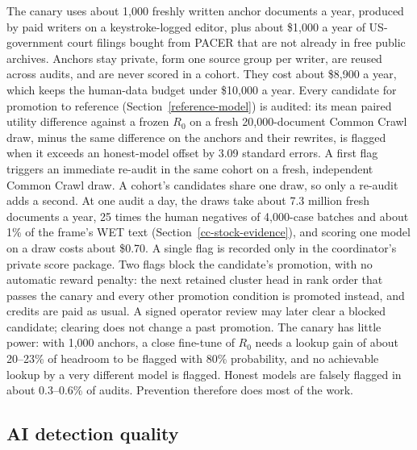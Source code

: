 The canary uses about 1,000 freshly written anchor documents a year, produced by
paid writers on a keystroke-logged editor, plus about \$1,000 a year of
US-government court filings bought from PACER that are not already in free
public archives. Anchors stay private, form one source group per writer, are
reused across audits, and are never scored in a cohort. They cost about \$8,900
a year, which keeps the human-data budget under \$10,000 a year. Every
candidate for promotion to reference (Section~\ref{reference-model}) is
audited: its mean paired utility difference against a frozen \(R_0\) on a fresh
20,000-document Common Crawl draw, minus the same difference on the anchors and
their rewrites, is flagged when it exceeds an honest-model offset by 3.09
standard errors. A first flag triggers an immediate re-audit in the same cohort
on a fresh, independent Common Crawl draw. A cohort's candidates share one
draw, so only a re-audit adds a second. At one audit a day, the draws take
about 7.3 million fresh documents a year, 25 times the human negatives of
4,000-case batches and about 1\% of the frame's WET text
(Section~\ref{cc-stock-evidence}), and scoring one model on a draw costs about
\$0.70. A single flag is recorded only in the coordinator's private score
package. Two flags block the candidate's promotion, with no automatic
reward penalty: the next retained cluster head in rank order that passes the
canary and every other promotion condition is promoted instead, and credits are paid as
usual. A signed operator review may later clear a blocked candidate; clearing
does not change a past promotion. The canary has little power: with 1,000 anchors, a
close fine-tune of \(R_0\) needs a lookup gain of about 20--23\% of headroom to
be flagged with 80\% probability, and no achievable lookup by a very different
model is flagged. Honest models are falsely flagged in about 0.3--0.6\% of
audits. Prevention therefore does most of the work.

\subsection{AI detection quality}\label{detection}

